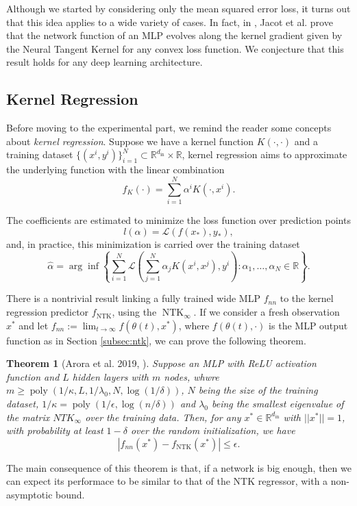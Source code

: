 \documentclass[11pt,notitlepage]{article}
\numberwithin{equation}{section}
\def\R{{\mathbb{R}}}
\DeclareMathOperator{\NTK}{NTK}
\DeclareMathOperator{\poly}{poly}
\newtheorem{theorem}{Theorem}[section]
\theoremstyle{remark}
\theoremstyle{definition}
\begin{document}
	Although we started by considering only the mean squared error loss, it turns out that this idea applies to a wide variety of cases.
	In fact, in \cite{jacot2018neural}, Jacot et al. prove that the network function of an MLP evolves along the kernel gradient given by the Neural Tangent Kernel for any convex loss function.
	We conjecture that this result holds for any deep learning architecture.
	
	\subsection{Kernel Regression}\label{subsec:kernelRegression}
	
	Before moving to the experimental part, we remind the reader some concepts about \emph{kernel regression}.
	Suppose we have a kernel function $K(\cdot, \cdot)$ and a training dataset $\{(x^i, y^i)\}_{i=1}^N \subset \R^{d_\text{in}} \times \R$, kernel regression aims to approximate the underlying function with the linear combination
	\begin{equation}\label{eq:kernelReg}
	f_K(\cdot) = \sum_{i=1}^N \alpha^i K(\cdot, x^i).
	\end{equation}
	
	The coefficients are estimated to minimize the loss function over prediction points
	\begin{equation*}
	l(\alpha) = \mathcal{L}(f(x_*), y_*),
	\end{equation*}
	and, in practice, this minimization is carried over the training dataset
	\begin{equation}\label{eq:kernelCoeff}
	\widehat{\alpha} = \arg\inf\left\{\sum_{i=1}^N \mathcal{L}\left(\sum_{j=1}^N \alpha_j K(x^i,x^j), y^i\right) : \alpha_1,\dots, \alpha_N \in \R \right\}.
	\end{equation}
	
	There is a nontrivial result linking a fully trained wide MLP $f_{nn}$ to the kernel regression predictor $f_{\NTK}$, using the $\NTK_\infty$.
	If we consider a fresh observation $x^*$ and let $f_{nn} := \lim_{t \rightarrow \infty} f(\theta(t), x^*)$, where $f(\theta(t), \cdot)$ is the MLP output function as in Section \ref{subsec:ntk}, we can prove the following theorem.
	\begin{theorem}[Arora et al. 2019, \cite{arora2019exact}]
		Suppose an MLP with ReLU activation function and $L$ hidden layers with $m$ nodes, whwre $m \geq \poly(1/\kappa, L, 1/\lambda_0, N, \log(1/\delta))$, $N$ being the size of the training dataset, $1/\kappa = \poly(1/\epsilon, \log(n/\delta))$ and $\lambda_0$ being the smallest eigenvalue of the matrix $NTK_\infty$ over the training data.
		Then, for any $x^* \in \R^{d_\text{in}}$ with $||x^*|| = 1$, with probability at least $1-\delta$ over the random initialization, we have 
		\[|f_{nn}(x^*) - f_{\NTK}(x^*)| \leq \epsilon. \]
	\end{theorem}
	The main consequence of this theorem is that, if a network is big enough, then we can expect its performace to be similar to that of the NTK regressor, with a non-asymptotic bound.
	
\end{document}
